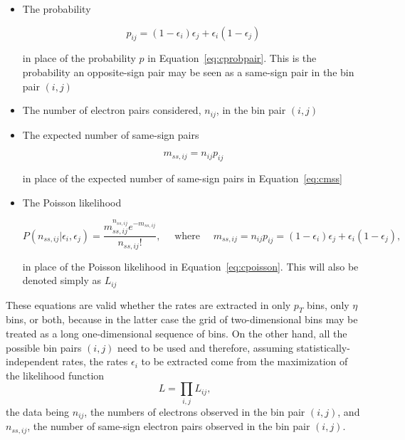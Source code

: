 \begin{itemize}
	\item The probability

	      \begin{equation}\label{eq:cijw}
		      p_{ij} = (1-\epsilon_i)\epsilon_j +  \epsilon_i(1-\epsilon_j)
	      \end{equation}

	      in place of the probability $p$ in Equation~\ref{eq:cprobpair}. This is the
	      probability an opposite-sign pair
	      may be seen as a same-sign pair in the bin pair $(i,j)$

	\item The number of electron pairs considered, $n_{ij}$,  in the bin pair $(i,j)$

	\item The expected number of same-sign pairs

	      \begin{equation}\label{eq:cmssij}
		      m_{ss,ij} = n_{ij} p_{ij}
	      \end{equation}

	      in place of the expected number of same-sign pairs in Equation~\ref{eq:cmss}


	\item The Poisson likelihood

	      \begin{equation}\label{eq:cpoissonij}
		      P(n_{ss,ij} | \epsilon_i, \epsilon_j) = \frac{m_{ss,ij}^{n_{ss,ij}} e^{-m_{ss,ij}}}{n_{ss,ij}!}
		      , \quad
		      \text{ where } \quad
		      m_{ss,ij} = n_{ij} p_{ij} = (1-\epsilon_i)\epsilon_j +  \epsilon_i(1-\epsilon_j),
	      \end{equation}

	      in place of the Poisson likelihood in Equation~\ref{eq:cpoisson}. This will also
	      be denoted simply as $L_{ij}$

\end{itemize}

These equations are valid whether the rates are extracted in only $p_T$ bins,
only $\eta$ bins, or both, because in the latter case the grid of
two-dimensional bins may be treated as a long one-dimensional sequence of bins.
On the other hand, all the possible bin pairs $(i,j)$ need to be used and
therefore, assuming statistically-independent rates, the rates $\epsilon_i$ to
be extracted come from the maximization of the likelihood function
%
$$
	L = \prod_{i,j}L_{ij},
$$
%
the data being $n_{ij}$, the numbers of electrons observed in the bin pair
$(i,j)$, and $n_{ss,ij}$, the number of same-sign electron pairs observed in
the bin pair $(i,j)$.

